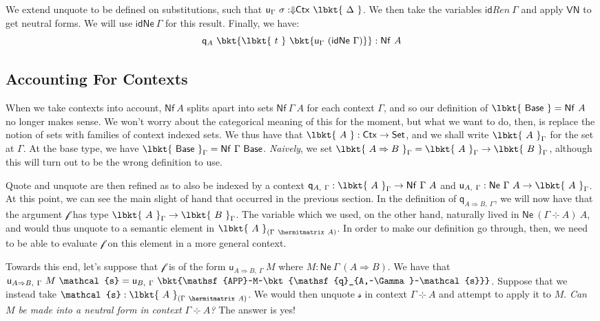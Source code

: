 We extend unquote to be defined on substitutions, such that $\mathsf{u}_\Gamma
~\sigma : \Downarrow\!\!\mathsf{Ctx}~ \lbkt{~\Delta~}$. We then take the
variables $\mathsf{id}\mathit{Ren}~\Gamma$ and apply $\mathsf{VN}$ to get
neutral forms. We will use $\mathsf{idNe}~\Gamma$ for this result. Finally, we
have:
\[\mathsf{q}_A~\bkt{\lbkt{~t~}~\bkt{\mathsf{u}_\Gamma~(\mathsf{idNe}~\Gamma)}}
: \mathsf{Nf}~A\]

\subsection{Accounting For Contexts}

When we take contexts into account, $\mathsf{Nf}~A$ splits apart into sets
$\mathsf{Nf}~\Gamma~A$ for each context $\Gamma$, and so our definition of
$\lbkt{~\mathsf{Base}~} = \mathsf{Nf}~A$ no longer makes sense. We won't worry
about the categorical meaning of this for the moment, but what we want to do,
then, is replace the notion of sets with families of context indexed sets.
We thus have that $\lbkt{~A~} : \mathsf{Ctx} \to \mathsf{Set}$, and we shall
write $\lbkt{~A~}_\Gamma$ for the set at $\Gamma$. At the base type, we have
$\lbkt{~\mathsf{Base}~}_\Gamma = \mathsf{Nf}~\Gamma~\mathsf{Base}$.
\emph{Naively}, we set $\lbkt{~A\Rightarrow B~}_\Gamma = \lbkt{~A~}_\Gamma \to
\lbkt{~B~}_\Gamma$, although this will turn out to be the wrong definition to
use.

Quote and unquote are then refined as to also be indexed by a context
$\mathsf{q}_{A,~\Gamma} : \lbkt{~A~}_\Gamma \to \mathsf{Nf}~\Gamma~A$ and
$\mathsf{u}_{A,~\Gamma} : \mathsf{Ne}~\Gamma~A \to \lbkt{~A~}_\Gamma$. At this
point, we can see the main slight of hand that occurred in the previous section.
In the definition of $\mathsf{q}_{A \Rightarrow B,~\Gamma}$, we will now have
that the argument $\mathcal{f}$ has type $\lbkt{~A~}_\Gamma \to
\lbkt{~B~}_\Gamma$. The variable which we used, on the other hand, naturally
lived in $\mathsf{Ne}~(\Gamma~\hermitmatrix~A)~A$, and would thus unquote
to a semantic element in $\lbkt{~A~}_{(\Gamma~\hermitmatrix~A)}$. In order to
make our definition go through, then, we need to be able to evaluate
$\mathcal{f}$ on this element in a more general context.

Towards this end, let's suppose that $\mathcal{f}$ is of the form $\mathsf{u}_{A
\Rightarrow B,~\Gamma}~M$ where $M : \mathsf{Ne}~\Gamma~ (A \Rightarrow B)$. We
have that $\mathsf{u}_{A \Rightarrow B,~\Gamma}~M~\mathcal{s} = \mathsf{u}
_{B,~\Gamma}~\bkt{\mathsf{APP}~M~\bkt{\mathsf{q}_{A,~\Gamma}~\mathcal{s}}}$.
Suppose that we instead take $\mathcal{s} : \lbkt{~A~}_{(\Gamma~\hermitmatrix
~A)}$. We would then unquote $\mathcal{s}$ in context $\Gamma~\hermitmatrix~A$
and attempt to apply it to $M$. \emph{Can $M$ be made into a neutral form in
context $\Gamma~\hermitmatrix~A$?} The answer is yes!

